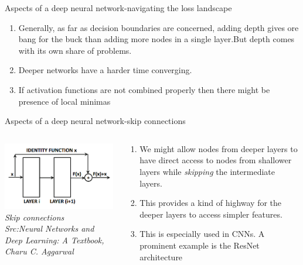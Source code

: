 \begin{frame}{Aspects of a deep neural network-navigating the loss landscape}
	\begin{enumerate}[$\bullet$]
		\item Generally, as far as decision boundaries are concerned, adding depth gives ore bang for the buck than adding more nodes in a single layer.\pause But depth comes with its own share of problems.\pause
		\item Deeper networks have a harder time converging.\pause
		\item If activation functions are not combined properly then there might be presence of local minimas
	\end{enumerate}
\end{frame}
\begin{frame}{Aspects of a deep neural network-skip connections}
	\begin{columns}[T]
        \begin{column}{0.4\textwidth}
        	\includegraphics[width=\textwidth]{images/skip.png}
			\tiny{\textit{Skip connections\\ Src:Neural Networks and Deep Learning: A Textbook, Charu C. Aggarwal}}
        \end{column}
	    \begin{column}{0.6\textwidth} 
			\begin{enumerate}[$\bullet$]
				\item We might allow nodes from deeper layers to have direct access to nodes from shallower layers while \textit{skipping} the intermediate layers.\pause
				\item This provides a kind of highway for the deeper layers to access simpler features.\pause
				\item This is especially used in CNNs. A prominent example is the ResNet architecture
			\end{enumerate}
    	\end{column}
    \end{columns}
\end{frame}
